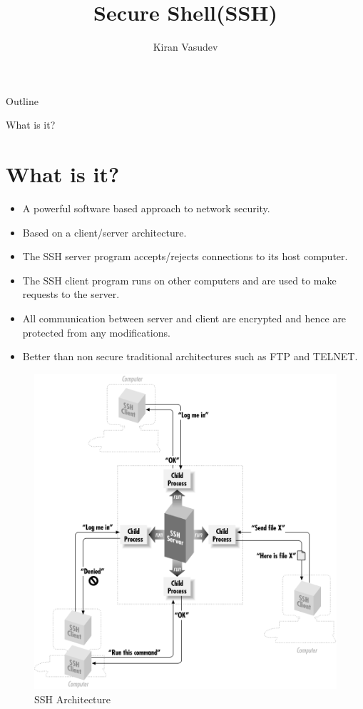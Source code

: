 \documentclass{beamer}
\title{Secure Shell(SSH)}
\author{Kiran Vasudev\inst{1}}
\institute[]
{
	\inst{1}
	Hochschule Bonn-Rhein-Sieg
	
}
\begin{document}
	
	\begin{frame}
	\titlepage
\end{frame}

\begin{frame}{Outline}
\tableofcontents
\end{frame}

\begin{frame}[allowframebreaks]{What is it?}
\section{What is it?}

	\begin{itemize}
		\item {
			A powerful software based approach to network security.
		}
		\item {
			Based on a client/server architecture.
		}
		\item{The SSH server program accepts/rejects connections to its host computer.}
		
		\item{
			The SSH client program runs on other computers and are used to make requests to the server.
		}
		\item{
			All communication between server and client are encrypted and hence are protected from any modifications.
		}
		\item{Better than non secure traditional architectures such as FTP and TELNET.}
		
	\end{itemize}
	\begin{figure}
		\includegraphics[scale=0.4]{images/arch}
		\caption{SSH Architecture\cite{arch}}
	\end{figure}
	


\end{frame}
\end{document}
